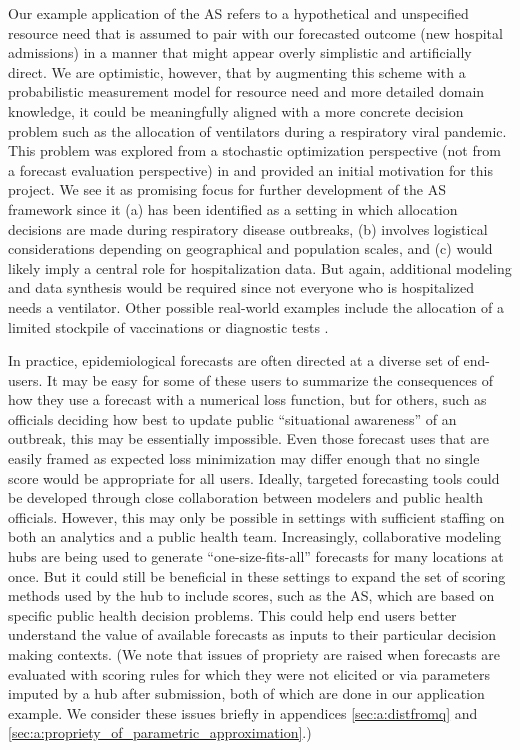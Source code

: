 \documentclass{article}\usepackage[]{graphicx}\usepackage[]{xcolor}
\begin{document}
Our example application of the AS refers to a hypothetical and unspecified resource need that is assumed to pair with
our forecasted outcome (new hospital admissions) in a manner that might appear overly simplistic and artificially
direct.  We are optimistic, however, that by augmenting this scheme with a probabilistic measurement model for resource
need and more detailed domain knowledge, it could be meaningfully aligned with a more concrete decision problem such as
the allocation of ventilators during a respiratory viral pandemic.  This problem was explored from a stochastic
optimization perspective (not from a forecast evaluation perspective) in \cite{huang_stockpiling_2017} and provided an
initial motivation for this project. We see it as promising focus for further development of the AS framework since it
(a) has been identified as a setting in which allocation decisions are made during respiratory disease outbreaks, (b) involves
logistical considerations depending on geographical and population scales, and (c) would likely imply a central role for
hospitalization data. But again, additional modeling and data synthesis would be required since not everyone who is
hospitalized needs a ventilator. Other possible real-world examples include the allocation of a limited stockpile of
vaccinations \citep{araz_geographic_2012,persad_fair_2023} or diagnostic tests
\citep{du_optimal_2022,pasco_covid-19_2023}.

In practice, epidemiological forecasts are often directed at a diverse set of end-users. It may be easy for some of
these users to summarize the consequences of how they use a forecast with a numerical loss function, but for others,
such as officials deciding how best to update public ``situational awareness'' of an outbreak, this may be essentially
impossible. Even those forecast uses that are easily framed as expected loss minimization may differ enough that no
single score would be appropriate for all users. Ideally, targeted forecasting tools could be developed through close
collaboration between modelers and public health officials. However, this may only be possible in settings with
sufficient staffing on both an analytics and a public health team. Increasingly, collaborative modeling hubs are being
used to generate ``one-size-fits-all'' forecasts for many locations at once. But it could still be beneficial in these
settings to expand the set of scoring methods used by the hub to include scores, such as the AS, which are based on
specific public health decision problems.  This could help end users better understand the value of available forecasts
as inputs to their particular decision making contexts. (We note that issues of propriety are raised when forecasts are
evaluated with scoring rules for which they were not elicited or via parameters imputed by a hub after submission, both
of which are done in our application example.  We consider these issues briefly in appendices
\ref{sec:a:distfromq} and \ref{sec:a:propriety_of_parametric_approximation}.)
\end{document}
